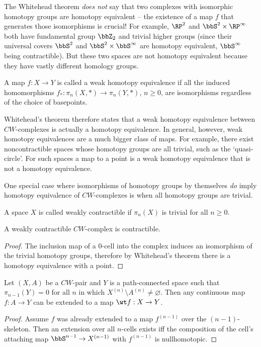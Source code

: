 \begin{rem}
    The Whitehead theorem \emph{does not} say that two complexes with isomorphic homotopy groups are homotopy equivalent -- the existence of a map $f$ that generates those isomorphisms is crucial! For example, $\RP^2$ and $\bbS^2\times \RP^\infty$ both have fundamental group $\bbZ_2$ and trivial higher groups (since their universal covers $\bbS^2$ and $\bbS^2\times \bbS^\infty$ are homotopy equivalent,  $\bbS^\infty$ being contractible). But these two spaces are not homotopy equivalent because they have vastly different homology groups.
\end{rem}

\begin{defn}\label{Homotopy equivalence!Weak}
    A map $f:X\to Y$ is called a weak homotopy equivalence if all the induced homomorphisms $f_\ast:\pi_n(X,*)\to \pi_n(Y,*)$, $n\geq 0$, are isomorphisms regardless of the choice of basepoints.
\end{defn}


Whitehead's theorem therefore states that a weak homotopy equivalence between $CW$-complexes is actually a homotopy equivalence.  In general, however, weak homotopy equivalences are a much bigger class of maps. For example, there exist noncontractible spaces whose homotopy groups are all trivial, such as the `quasi-circle'. For such spaces a map to a point is a weak homotopy equivalence that is not a homotopy equivalence. 

One special case where isomorphisms of homotopy groups by themselves \emph{do} imply homotopy equivalence of $CW$-complexes is when all homotopy groups are trivial.

\begin{defn}
    A space $X$ is called weakly contractible if $\pi_n(X)$ is trivial for all $n\geq 0$.
\end{defn}

\begin{cor}
    A weakly contractible $CW$-complex is contractible.
\end{cor}
\begin{proof}
    The inclusion map of a $0$-cell into the complex induces an isomorphism of the trivial homotopy groups, therefore by Whitehead's theorem there is a homotopy equivalence with a point.
\end{proof}

\begin{lem}\label{lem 4.7 Hatcher}
    Let $(X,A)$ be a $CW$-pair and $Y$ is a path-connected space such that $\pi_{n-1}(Y)=0$ for all $n$ in which $X^{(n)}\setminus A^{(n)}\neq \varnothing$. Then any continuous map $f:A\to Y$ can be extended to a map $\wt f:X\to Y$.
\end{lem}
\begin{proof}
    Assume $f$ was already extended to a map $f^{(n-1)}$ over the $(n-1)$-skeleton. Then an extension over all $n$-cells exists iff the composition of the cell's attaching map $\bbS^{n-1}\to X^{(n-1)}$ with $f^{(n-1)}$ is nullhomotopic.
\end{proof}





